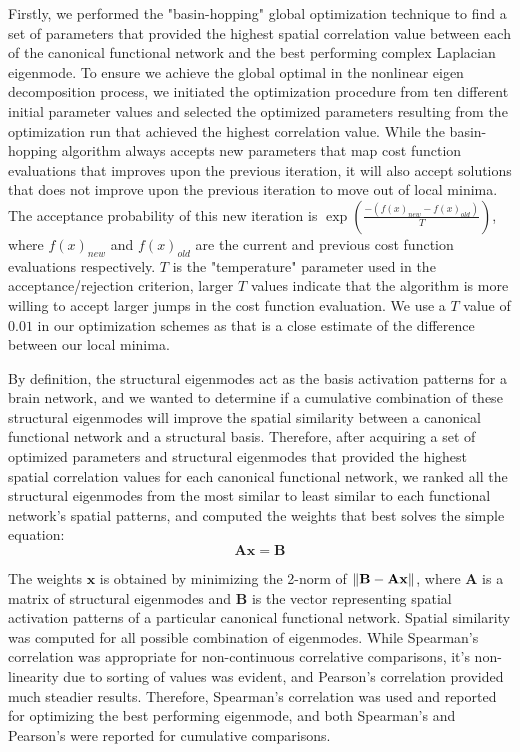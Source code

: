 \documentclass{article}
\begin{document}
Firstly, we performed the "basin-hopping" global optimization technique \cite{Wales1997} to find a set of parameters that provided the highest spatial correlation value between each of the canonical functional network and the best performing complex Laplacian eigenmode. To ensure we achieve the global optimal in the nonlinear eigen decomposition process, we initiated the optimization procedure from ten different initial parameter values and selected the optimized parameters resulting from the optimization run that achieved the highest correlation value. While the basin-hopping algorithm always accepts new parameters that map cost function evaluations that improves upon the previous iteration, it will also accept solutions that does not improve upon the previous iteration to move out of local minima. The acceptance probability of this new iteration is $\exp(\frac{-(f(x)_{new} - f(x)_{old})}{T})$, where $f(x)_{new}$ and $f(x)_{old}$ are the current and previous cost function evaluations respectively. $T$ is the "temperature" parameter used in the acceptance/rejection criterion, larger $T$ values indicate that the algorithm is more willing to accept larger jumps in the cost function evaluation. We use a $T$ value of $0.01$ in our optimization schemes as that is a close estimate of the difference between our local minima.

By definition, the structural eigenmodes act as the basis activation patterns for a brain network, and we wanted to determine if a cumulative combination of these structural eigenmodes will improve the spatial similarity between a canonical functional network and a structural basis. Therefore, after acquiring a set of optimized parameters and structural eigenmodes that provided the highest spatial correlation values for each canonical functional network, we ranked all the structural eigenmodes from the most similar to least similar to each functional network's spatial patterns, and computed the weights that best solves the simple equation:
\begin{equation}
    \mathbf{Ax = B}
\end{equation}

The weights $\mathbf{x}$ is obtained by minimizing the 2-norm of $\mathbf{\norm{B-Ax}}$, where $\mathbf{A}$ is a matrix of structural eigenmodes and $\mathbf{B}$ is the vector representing spatial activation patterns of a particular canonical functional network. Spatial similarity was computed for all possible combination of eigenmodes. While Spearman's correlation was appropriate for non-continuous correlative comparisons, it's non-linearity due to sorting of values was evident, and Pearson's correlation provided much steadier results. Therefore, Spearman's correlation was used and reported for optimizing the best performing eigenmode, and both Spearman's and Pearson's were reported for cumulative comparisons.
\end{document}
